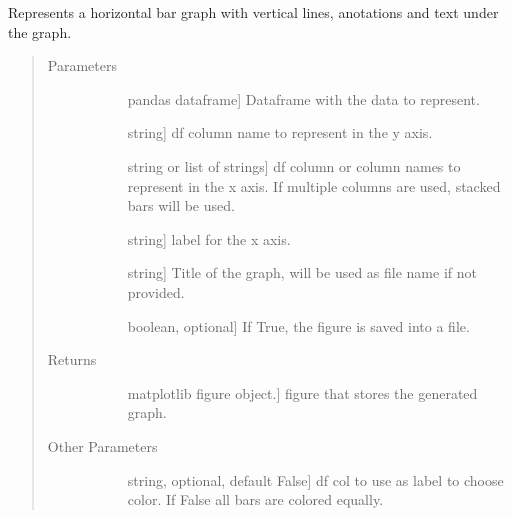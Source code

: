 \documentclass[letterpaper,10pt,english]{sphinxmanual}
\begin{document}
\begin{fulllineitems}
\label{\detokenize{rstFiles/horizontalBarPlot:horizontalBarPlot.hBarPlot}}
Represents a horizontal bar graph with vertical lines, 
anotations and text under the graph.
\begin{quote}\begin{description}
\item[{Parameters}] \leavevmode\begin{description}
\item[{}] \leavevmode{[}pandas dataframe{]}
Dataframe with the data to represent.

\item[{}] \leavevmode{[}string{]}
df column name to represent in the y axis.

\item[{}] \leavevmode{[}string or list of strings{]}
df column or column names 
to represent in the x axis. If multiple columns are used,
stacked bars will be used.

\item[{}] \leavevmode{[}string{]}
label for the x axis.

\item[{}] \leavevmode{[}string{]}
Title of the graph, will be used as file name if not provided.

\item[{}] \leavevmode{[}boolean, optional{]}
If True, the figure is saved into a file.

\end{description}

\item[{Returns}] \leavevmode\begin{description}
\item[{}] \leavevmode{[}matplotlib figure object.{]}
figure that stores the generated graph.

\end{description}

\item[{Other Parameters}] \leavevmode\begin{description}
\item[{}] \leavevmode{[}string, optional, default False{]}
df col to use as label to choose color. 
If False all bars are colored equally.


\end{description}
\end{description}
\end{quote}
\end{fulllineitems}
\end{document}
